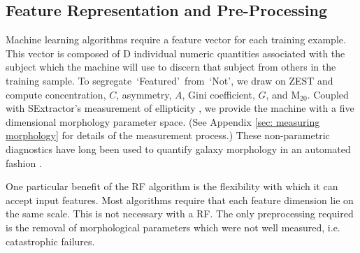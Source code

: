 \documentclass[twocolumn]{aastex6}
\newcommand{\feat}{`Featured'}
\newcommand{\notfeat}{`Not'}
\begin{document}
 
\subsection{Feature Representation and Pre-Processing}
Machine learning algorithms require a feature vector for each training example. 
This vector is composed of D individual numeric quantities associated with the 
subject which the machine will use to discern that subject from others in the 
training sample. To segregate~\feat~from~\notfeat, we draw
on ZEST \citep{Scarlata2007} and compute concentration, $C$, asymmetry, $A$, 
Gini coefficient, $G$, and M$_{20}$. Coupled with SExtractor's measurement 
of ellipticity \citep{sextractor}, we provide the machine with a five dimensional morphology parameter space. 
(See Appendix \ref{sec: measuring morphology} for details of the measurement process.)
These non-parametric diagnostics have long been used to 
quantify galaxy morphology in an automated fashion \cite[e.g.,][]{Abraham1996, Bershady2000, Conselice2000, Abraham2003, Conselice2003, Lotz2004, Snyder2015}.

One particular benefit of the RF algorithm is the flexibility with which it can accept input 
features. Most algorithms require that each feature dimension lie on the same scale. 
This is not necessary with a RF. The only preprocessing required is the removal of morphological parameters which were not well measured, i.e. catastrophic failures. 

\end{document}
